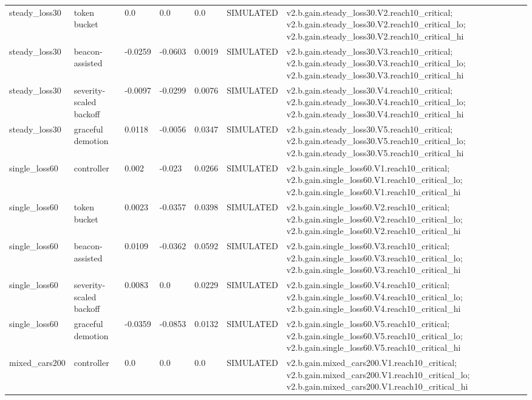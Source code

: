 \begin{table}[t]
\begin{tabular}{lllllll}
steady\_loss30 & token bucket & 0.0 & 0.0 & 0.0 & SIMULATED & v2.b.gain.steady\_loss30.V2.reach10\_critical; v2.b.gain.steady\_loss30.V2.reach10\_critical\_lo; v2.b.gain.steady\_loss30.V2.reach10\_critical\_hi \\
steady\_loss30 & beacon-assisted & -0.0259 & -0.0603 & 0.0019 & SIMULATED & v2.b.gain.steady\_loss30.V3.reach10\_critical; v2.b.gain.steady\_loss30.V3.reach10\_critical\_lo; v2.b.gain.steady\_loss30.V3.reach10\_critical\_hi \\
steady\_loss30 & severity-scaled backoff & -0.0097 & -0.0299 & 0.0076 & SIMULATED & v2.b.gain.steady\_loss30.V4.reach10\_critical; v2.b.gain.steady\_loss30.V4.reach10\_critical\_lo; v2.b.gain.steady\_loss30.V4.reach10\_critical\_hi \\
steady\_loss30 & graceful demotion & 0.0118 & -0.0056 & 0.0347 & SIMULATED & v2.b.gain.steady\_loss30.V5.reach10\_critical; v2.b.gain.steady\_loss30.V5.reach10\_critical\_lo; v2.b.gain.steady\_loss30.V5.reach10\_critical\_hi \\
single\_loss60 & controller & 0.002 & -0.023 & 0.0266 & SIMULATED & v2.b.gain.single\_loss60.V1.reach10\_critical; v2.b.gain.single\_loss60.V1.reach10\_critical\_lo; v2.b.gain.single\_loss60.V1.reach10\_critical\_hi \\
single\_loss60 & token bucket & 0.0023 & -0.0357 & 0.0398 & SIMULATED & v2.b.gain.single\_loss60.V2.reach10\_critical; v2.b.gain.single\_loss60.V2.reach10\_critical\_lo; v2.b.gain.single\_loss60.V2.reach10\_critical\_hi \\
single\_loss60 & beacon-assisted & 0.0109 & -0.0362 & 0.0592 & SIMULATED & v2.b.gain.single\_loss60.V3.reach10\_critical; v2.b.gain.single\_loss60.V3.reach10\_critical\_lo; v2.b.gain.single\_loss60.V3.reach10\_critical\_hi \\
single\_loss60 & severity-scaled backoff & 0.0083 & 0.0 & 0.0229 & SIMULATED & v2.b.gain.single\_loss60.V4.reach10\_critical; v2.b.gain.single\_loss60.V4.reach10\_critical\_lo; v2.b.gain.single\_loss60.V4.reach10\_critical\_hi \\
single\_loss60 & graceful demotion & -0.0359 & -0.0853 & 0.0132 & SIMULATED & v2.b.gain.single\_loss60.V5.reach10\_critical; v2.b.gain.single\_loss60.V5.reach10\_critical\_lo; v2.b.gain.single\_loss60.V5.reach10\_critical\_hi \\
mixed\_cars200 & controller & 0.0 & 0.0 & 0.0 & SIMULATED & v2.b.gain.mixed\_cars200.V1.reach10\_critical; v2.b.gain.mixed\_cars200.V1.reach10\_critical\_lo; v2.b.gain.mixed\_cars200.V1.reach10\_critical\_hi \\

\end{tabular}
\end{table}
